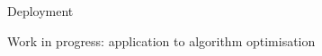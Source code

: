 \documentclass{beamer}
\begin{document}
\begin{frame}{Deployment}






\end{frame}


\begin{frame}{Work in progress: application to algorithm optimisation}





\end{frame}
\end{document}
